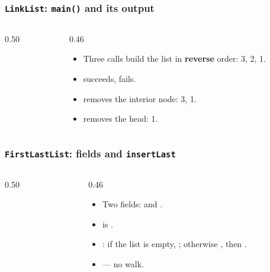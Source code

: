 \documentclass[aspectratio=169,10pt,compress]{beamer}
\begin{document}
\begin{frame}[t,fragile] \frametitle{\texttt{LinkList}: \texttt{main()} and its output}
  \begin{columns}[T]
    \begin{column}{0.50\textwidth}
    \end{column}
    \begin{column}{0.46\textwidth}
      \small
      \begin{itemize}
        \item Three  calls build the list in
              \textbf{reverse} order: 3, 2, 1.
        \item {} succeeds,  fails.
        \item {} removes the interior node: 3, 1.
        \item {} removes the head: 1.
      \end{itemize}
    \end{column}
  \end{columns}
\end{frame}





\begin{frame}[t,fragile] \frametitle{\texttt{FirstLastList}: fields and \texttt{insertLast}}
  \begin{columns}[T]
    \begin{column}{0.50\textwidth}
    \end{column}
    \begin{column}{0.46\textwidth}
      \begin{itemize}\small
        \item Two fields:  and .
        \item {} is .
        \item {}: if the list is empty,
              ;
              otherwise , then
              .
        \item {} — no walk.
      \end{itemize}
    \end{column}
  \end{columns}
\end{frame}
\end{document}
